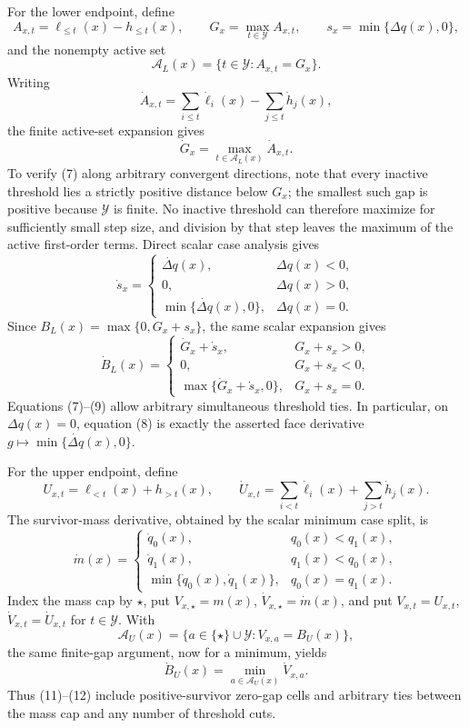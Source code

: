 For the lower endpoint, define
\[
A_{x,t}=\ell_{\le t}(x)-h_{\le t}(x),\qquad
G_x=\max_{t\in\mathcal Y}A_{x,t},\qquad
s_x=\min\{\Delta q(x),0\},
\tag{6}
\]
and the nonempty active set
\[
\mathcal A_L(x)=\{t\in\mathcal Y:A_{x,t}=G_x\}.
\]
Writing
\[
\dot A_{x,t}=\sum_{i\le t}\dot\ell_i(x)
-\sum_{j\le t}\dot h_j(x),
\]
the finite active-set expansion gives
\[
\dot G_x=\max_{t\in\mathcal A_L(x)}\dot A_{x,t}.
\tag{7}
\]
To verify (7) along arbitrary convergent directions, note that every
inactive threshold lies a strictly positive distance below \(G_x\); the
smallest such gap is positive because \(\mathcal Y\) is finite.  No
inactive threshold can therefore maximize for sufficiently small step
size, and division by that step leaves the maximum of the active
first-order terms.  Direct scalar case analysis gives
\[
\dot s_x=
\begin{cases}
\dot{\Delta q}(x),&\Delta q(x)<0,\\
0,&\Delta q(x)>0,\\
\min\{\dot{\Delta q}(x),0\},&\Delta q(x)=0.
\end{cases}
\tag{8}
\]
Since \(B_L(x)=\max\{0,G_x+s_x\}\), the same scalar expansion gives
\[
\dot B_L(x)=
\begin{cases}
\dot G_x+\dot s_x,&G_x+s_x>0,\\
0,&G_x+s_x<0,\\
\max\{\dot G_x+\dot s_x,0\},&G_x+s_x=0.
\end{cases}
\tag{9}
\]
Equations (7)--(9) allow arbitrary simultaneous threshold ties.  In
particular, on \(\Delta q(x)=0\), equation (8) is exactly the asserted
face derivative \(g\mapsto\min\{\dot{\Delta q}(x),0\}\).

For the upper endpoint, define
\[
U_{x,t}=\ell_{<t}(x)+h_{>t}(x),
\qquad
\dot U_{x,t}=\sum_{i<t}\dot\ell_i(x)+\sum_{j>t}\dot h_j(x).
\tag{10}
\]
The survivor-mass derivative, obtained by the scalar minimum case split,
is
\[
\dot m(x)=
\begin{cases}
\dot q_0(x),&q_0(x)<q_1(x),\\
\dot q_1(x),&q_1(x)<q_0(x),\\
\min\{\dot q_0(x),\dot q_1(x)\},&q_0(x)=q_1(x).
\end{cases}
\tag{11}
\]
Index the mass cap by \(\star\), put
\(V_{x,\star}=m(x)\), \(\dot V_{x,\star}=\dot m(x)\), and put
\(V_{x,t}=U_{x,t}\), \(\dot V_{x,t}=\dot U_{x,t}\) for
\(t\in\mathcal Y\).  With
\[
\mathcal A_U(x)=
\{a\in\{\star\}\cup\mathcal Y:V_{x,a}=B_U(x)\},
\]
the same finite-gap argument, now for a minimum, yields
\[
\dot B_U(x)=\min_{a\in\mathcal A_U(x)}\dot V_{x,a}.
\tag{12}
\]
Thus (11)--(12) include positive-survivor zero-gap cells and arbitrary
ties between the mass cap and any number of threshold cuts.

